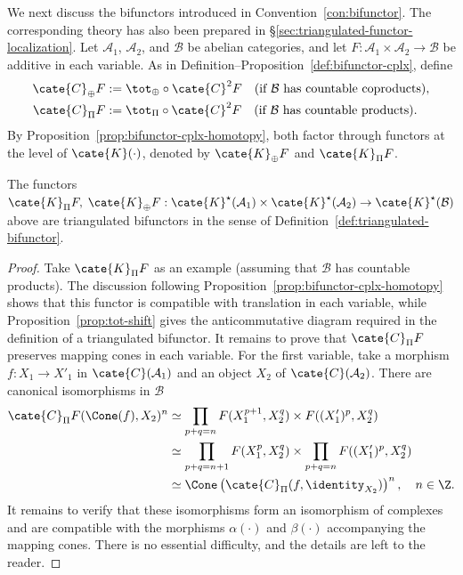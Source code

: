 We next discuss the bifunctors introduced in
Convention~\ref{con:bifunctor}. The corresponding theory has also been
prepared in \S\ref{sec:triangulated-functor-localization}. Let
$\mathcal{A}_1$, $\mathcal{A}_2$, and $\mathcal{B}$ be abelian categories,
and let $F:\mathcal{A}_1\times\mathcal{A}_2\to\mathcal{B}$ be additive in
each variable. As in Definition--Proposition~\ref{def:bifunctor-cplx}, define
\begin{equation}\label{eqn:totCF}\begin{aligned}
		\cate{C}_{\oplus} F & := \tot_{\oplus} \circ \cate{C}^2 F \quad \text{(if $\mathcal{B}$ has countable coproducts)}, \\
		\cate{C}_{\Pi} F & := \tot_{\Pi} \circ \cate{C}^2 F \quad \text{(if $\mathcal{B}$ has countable products)}.
\end{aligned}\end{equation}
By Proposition~\ref{prop:bifunctor-cplx-homotopy}, both factor through
functors at the level of $\cate{K}(\cdot)$, denoted by
$\cate{K}_{\oplus}F$ and $\cate{K}_{\Pi}F$.

\begin{proposition}
	The functors
	$\cate{K}_{\Pi}F,\;\cate{K}_{\oplus}F:
	\cate{K}^\star(\mathcal{A}_1)\times\cate{K}^\star(\mathcal{A}_2)
	\to\cate{K}^\star(\mathcal{B})$ above are triangulated bifunctors in the
	sense of Definition~\ref{def:triangulated-bifunctor}.
\end{proposition}
\begin{proof}
	Take $\cate{K}_{\Pi}F$ as an example (assuming that $\mathcal{B}$ has
	countable products). The discussion following
	Proposition~\ref{prop:bifunctor-cplx-homotopy} shows that this functor is
	compatible with translation in each variable, while
	Proposition~\ref{prop:tot-shift} gives the anticommutative diagram required
	in the definition of a triangulated bifunctor. It remains to prove that
	$\cate{C}_{\Pi}F$ preserves mapping cones in each variable. For the first
	variable, take a morphism $f:X_1\to X'_1$ in
	$\cate{C}(\mathcal{A}_1)$ and an object $X_2$ of
	$\cate{C}(\mathcal{A}_2)$. There are canonical isomorphisms in
	$\mathcal{B}$
	\begin{align*}
		\cate{C}_{\Pi}F(\Cone(f), X_2)^n & \simeq \prod_{p+q=n} F(X_1^{p+1}, X_2^q ) \times F( (X'_1)^p, X_2^q ) \\
		& \simeq \prod_{p+q=n+1} F( X_1^p, X_2^q ) \times \prod_{p+q=n} F( (X'_1)^p, X_2^q ) \\
		& \simeq \Cone\left(\cate{C}_{\Pi}(f, \identity_{X_2}) \right)^n , \quad n \in \Z.
	\end{align*}
	It remains to verify that these isomorphisms form an isomorphism of
	complexes and are compatible with the morphisms $\alpha(\cdot)$ and
	$\beta(\cdot)$ accompanying the mapping cones. There is no essential
	difficulty, and the details are left to the reader.
\end{proof}

